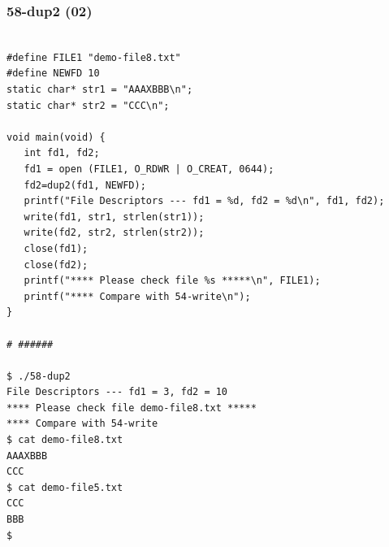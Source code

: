 \documentclass[xcolor=table, notheorems, hyperref={pdfpagelabels=false}]{beamer}
\begin{document}
\begin{frame}[fragile]
\frametitle{58-dup2 (02)}
\begin{lstlisting}[basicstyle=\ttfamily\tiny]

#define FILE1 "demo-file8.txt"
#define NEWFD 10
static char* str1 = "AAAXBBB\n";
static char* str2 = "CCC\n";

void main(void) {
   int fd1, fd2;
   fd1 = open (FILE1, O_RDWR | O_CREAT, 0644);
   fd2=dup2(fd1, NEWFD);
   printf("File Descriptors --- fd1 = %d, fd2 = %d\n", fd1, fd2);
   write(fd1, str1, strlen(str1));
   write(fd2, str2, strlen(str2));
   close(fd1);
   close(fd2);
   printf("**** Please check file %s *****\n", FILE1);
   printf("**** Compare with 54-write\n");
}

# ######

$ ./58-dup2 
File Descriptors --- fd1 = 3, fd2 = 10
**** Please check file demo-file8.txt *****
**** Compare with 54-write
$ cat demo-file8.txt 
AAAXBBB
CCC
$ cat demo-file5.txt 
CCC
BBB
$ 

\end{lstlisting}
\end{frame}

\end{document}
